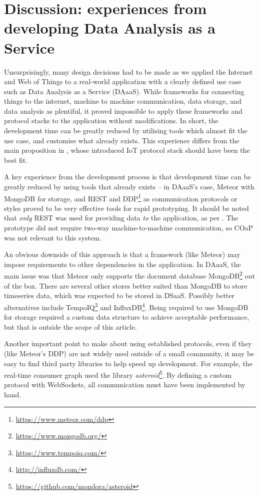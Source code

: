 \section{Discussion: experiences from developing Data Analysis as a Service}
Unsurprisingly, many design decisions had to be made as we applied the Internet and Web of Things to a real-world application with a clearly defined use case such as Data Analysis as a Service (DAaaS). While frameworks for connecting things to the internet, machine to machine communication, data storage, and data analysis as plentiful, it proved impossible to apply these frameworks and protocol stacks to the application without modifications. In short, the development time can be greatly reduced by utilising tools which almost fit the use case, and customise what already exists. This experience differs from the main proposition in \textcite{palattella-accettura-vilajosana-watteyne-gieco-boggia-dohler:standardized-protocol-stack-for-the-internet-of-important-things:2012}, whose introduced IoT protocol stack should have been the best fit.

A key experience from the development process is that development time can be greatly reduced by using tools that already exists -- in DAaaS's case, Meteor with MongoDB for storage, and REST and DDP\footnote{\url{https://www.meteor.com/ddp}} as communication protocols or styles proved to be very effective tools for rapid prototyping. It should be noted that \textit{only} REST was used for providing data \textit{to} the application, as per \textcite{uckelmann-harrison-michahelles:architecting-the-internet-of-things:2011}. The prototype did not require two-way machine-to-machine communication, so COaP was not relevant to this system.

An obvious downside of this approach is that a framework (like Meteor) may impose requirements to other dependencies in the application. In DAaaS, the main issue was that Meteor only supports the document database MongoDB\footnote{\url{https://www.mongodb.org/}} out of the box. There are several other stores better suited than MongoDB to store timeseries data, which was expected to be stored in DSaaS. Possibly better alternatives include TempoIQ\footnote{\url{https://www.tempoiq.com/}} and InfluxDB\footnote{\url{http://influxdb.com/}}. Being required to use MongoDB for storage required a custom data structure to achieve acceptable performance, but that is outside the scope of this article.

Another important point to make about using established protocols, even if they (like Meteor's DDP) are not widely used outside of a small community, it may be easy to find third party libraries to help speed up development. For example, the real-time consumer graph used the library \textit{asteroid}\footnote{\url{https://github.com/mondora/asteroid}}. By defining a custom protocol with WebSockets, all communication must have been implemented by hand.

